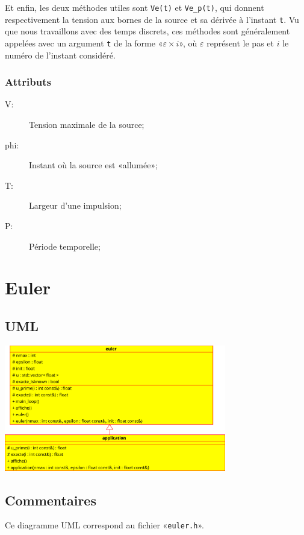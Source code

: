 \documentclass{report}
\begin{document}
\begin{multicols}{2}
            Et enfin, les deux méthodes utiles sont \verb|Ve(t)| et \verb|Ve_p(t)|, qui donnent respectivement
            la tension aux bornes de la source et sa dérivée à l’instant \verb|t|. Vu que nous travaillons avec
            des temps discrets, ces méthodes sont généralement appelées avec un argument \verb|t| de la forme 
            «$\varepsilon \times i$», où $\varepsilon$ représent le pas et $i$ le numéro de l’instant considéré.

            \subsection{Attributs}

            \begin{description}
                \item[V:] Tension maximale de la source;
                \item[phi:] Instant où la source est «allumée»;
                \item[T:] Largeur d’une impulsion;
                \item[P:] Période temporelle;
            \end{description}
    \end{multicols}

\chapter{Euler}
    \section{UML}
        \includegraphics[height=5.5cm]{images/euler_alone}

    \section{Commentaires}
        Ce diagramme UML correspond au fichier «\verb|euler.h|».
\end{document}
